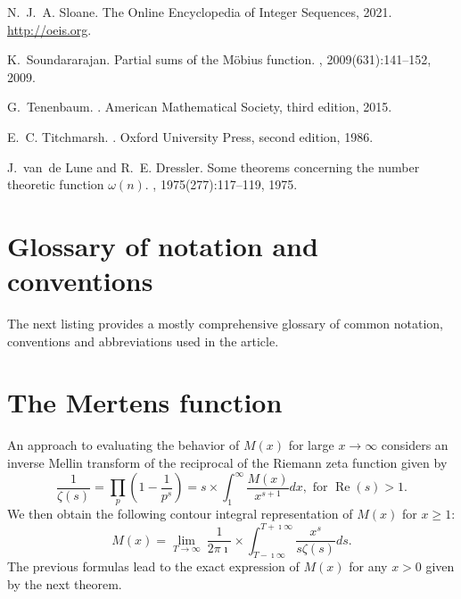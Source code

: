 \documentclass[11pt,reqno,a4letter]{article}
\numberwithin{equation}{section}
\numberwithin{figure}{section}
\numberwithin{table}{section}
\theoremstyle{plain}
\numberwithin{theorem}{section}
\theoremstyle{definition}
\renewcommand{\Re}{\operatorname{Re}}
\begin{document}
\begin{thebibliography}{10}
N.~J.~A. Sloane.
\newblock The {O}nline {E}ncyclopedia of {I}nteger {S}equences, 2021.
\newblock \url{http://oeis.org}.

K.~Soundararajan.
\newblock Partial sums of the {M}{\"{o}}bius function.
, 2009(631):141--152, 2009.

G.~Tenenbaum.
.
\newblock American Mathematical Society, third edition, 2015.

E.~C. Titchmarsh.
.
\newblock Oxford University Press, second edition, 1986.

J.~van~de Lune and R.~E. Dressler.
\newblock Some theorems concerning the number theoretic function $\omega(n)$.
, 1975(277):117--119, 1975.

\end{thebibliography}

\appendix
{}
\setcounter{section}{0} 
\renewcommand{\thesection}{\Alph{section}} 

\newpage
\section{Glossary of notation and conventions}
\label{Section_NotationAndConventions}

The next listing provides a mostly comprehensive 
glossary of common notation, conventions and 
abbreviations used in the article. 

\renewcommand*{\glsclearpage}{}
\renewcommand{\glossarysection}[2][]{}
\printglossary[type={symbols},
               style={glossstyleSymbol},
               nogroupskip=true]

\section{The Mertens function}
\label{subSection_Intro_Mx_properties} 

An approach to evaluating the 
behavior of $M(x)$ for large $x \rightarrow \infty$ considers an 
inverse Mellin transform of the reciprocal of the Riemann zeta function given by 
\[
\frac{1}{\zeta(s)} = \prod_{p} \left(1 - \frac{1}{p^s}\right) = 
     s \times \int_1^{\infty} \frac{M(x)}{x^{s+1}} dx, \text{ for } \Re(s) > 1. 
\]
We then obtain the following contour integral representation of $M(x)$ for $x \geq 1$: 
\[
M(x) = \lim_{T \rightarrow \infty}\ \frac{1}{2\pi\imath} \times \int_{T-\imath\infty}^{T+\imath\infty} 
     \frac{x^s}{s \zeta(s)} ds. 
\] 
The previous formulas lead to the 
exact expression of $M(x)$ for any $x > 0$ 
given by the next theorem. 
\nocite{TITCHMARSH} 
\end{document}
